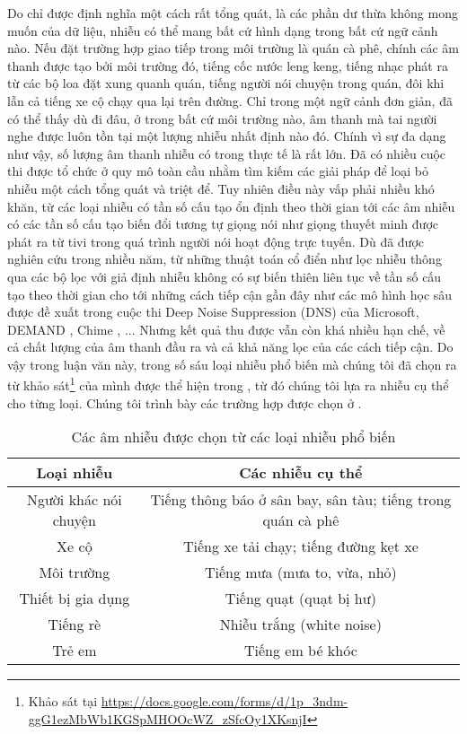 		Do chỉ được định nghĩa một cách rất tổng quát, là các phần dư thừa không mong muốn của dữ liệu, nhiễu có thể mang bất cứ hình dạng trong bất cứ ngữ cảnh nào. Nếu đặt trường hợp giao tiếp trong môi trường là quán cà phê, chính các âm thanh được tạo bởi môi trường đó, tiếng cốc nước leng keng, tiếng nhạc phát ra từ các bộ loa đặt xung quanh quán, tiếng người nói chuyện trong quán, đôi khi lẫn cả tiếng xe cộ chạy qua lại trên đường. Chỉ trong một ngữ cảnh đơn giản, đã có thể thấy dù đi đâu, ở trong bất cứ môi trường nào, âm thanh mà tai người nghe được luôn tồn tại một lượng nhiễu nhất định nào đó. Chính vì sự đa dạng như vậy, số lượng âm thanh nhiễu có trong thực tế là rất lớn. Đã có nhiều cuộc thi được tổ chức ở quy mô toàn cầu nhằm tìm kiếm các giải pháp để loại bỏ nhiễu một cách tổng quát và triệt để. Tuy nhiên điều này vấp phải nhiều khó khăn, từ các loại nhiễu có tần số cấu tạo ổn định theo thời gian tới các âm nhiễu có các tần số cấu tạo biến đổi tương tự giọng nói như giọng thuyết minh được phát ra từ tivi trong quá trình người nói hoạt động trực tuyến. Dù đã được nghiên cứu trong nhiều năm, từ những thuật toán cổ điển như lọc nhiễu thông qua các bộ lọc với giả định nhiễu không có sự biến thiên liên tục về tần số cấu tạo theo thời gian cho tới những cách tiếp cận gần đây như các mô hình học sâu được đề xuất trong cuộc thi Deep Noise Suppression (DNS) \cite{dns} của Microsoft, DEMAND \cite{demand}, Chime \cite{chime}, ... Nhưng kết quả thu được vẫn còn khá nhiều hạn chế, về cả chất lượng của âm thanh đầu ra và cả khả năng lọc của các cách tiếp cận. Do vậy trong luận văn này, trong số sáu loại nhiễu phổ biến mà chúng tôi đã chọn ra từ khảo sát\footnote{Khảo sát tại \url{https://docs.google.com/forms/d/1p_3ndm-ggG1ezMbWb1KGSpMHOOcWZ_zSfcOy1XKsnjI}} của mình được thể hiện trong , từ đó chúng tôi lựa ra nhiễu cụ thể cho từng loại. Chúng tôi trình bày các trường hợp được chọn ở .
		
			\begin{table}
				\centering
				\begin{tabular}{c c}
					\hline
					\textbf{Loại nhiễu}		& \textbf{Các nhiễu cụ thể}\\
					\hline
					Người khác nói chuyện	& Tiếng thông báo ở sân bay, sân tàu; tiếng trong quán cà phê\\
					Xe cộ					& Tiếng xe tải chạy; tiếng đường kẹt xe\\
					Môi trường				& Tiếng mưa (mưa to, vừa, nhỏ)\\
					Thiết bị gia dụng		& Tiếng quạt (quạt bị hư)\\
					Tiếng rè				& Nhiễu trắng (white noise)\\
					Trẻ em					& Tiếng em bé khóc\\
					\hline
				\end{tabular}
			\caption{Các âm nhiễu được chọn từ các loại nhiễu phổ biến}
			\label{intro::noises}
			\end{table}
	
